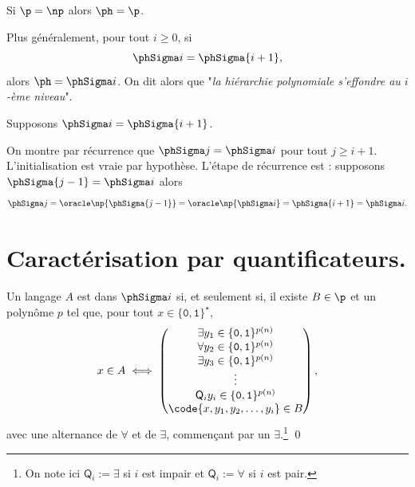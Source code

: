 \documentclass[./main]{subfiles}
\begin{document}
  \begin{prop}
    Si $\p = \np$ alors  $\ph = \p$.

    Plus généralement, pour tout  $i \ge 0$, si 
    \[
      \phSigma i = \phSigma {i+1}
    ,\]
    alors $\ph = \phSigma i$.
    On dit alors que "\textit{la hiérarchie polynomiale s'effondre au $i$-ème niveau}".
  \end{prop}
  \begin{prv}
    Supposons $\phSigma i = \phSigma {i+1}$.

    On montre par récurrence que  $\phSigma j = \phSigma i$ pour tout $j \ge i+1$.
    L'initialisation est vraie par hypothèse.
    L'étape de récurrence est : supposons $\phSigma {j-1} = \phSigma i$ alors 
     \[
     \phSigma j = \oracle \np {\phSigma {j-1}} = \oracle \np {\phSigma i} = \phSigma {i+1} = \phSigma i
    .\]
  \end{prv}

  \section{Caractérisation par quantificateurs.}

  \begin{thm}
    Un langage $A$ est dans $\phSigma i$ si, et seulement si, il existe  $B \in \p$ et un polynôme $p$ tel que, pour tout  $x \in \{\texttt{0},\texttt{1}\}^\star$,
    \[
      x \in A \iff
      \begin{pmatrix}
      \exists y_1 \in \{\texttt{0},\texttt{1}\}^{p(n)} \\
      \forall y_2 \in \{\texttt{0},\texttt{1}\}^{p(n)} \\
      \exists y_3 \in \{\texttt{0},\texttt{1}\}^{p(n)} \\
      \vdots\\
      \mathsf{Q}_i y_i \in \{\texttt{0},\texttt{1}\}^{p(n)} \\
      \code{x, y_1, y_2, \ldots, y_i} \in B
      \end{pmatrix}
    ,\]
    avec une alternance de $\forall$ et de $\exists$, commençant par un $\exists$.\footnote{On note ici $\mathsf{Q}_i := \exists$ si $i$ est impair et $\mathsf{Q}_i := \forall$ si $i$ est pair.}
    \qed
  \end{thm}
\end{document}
